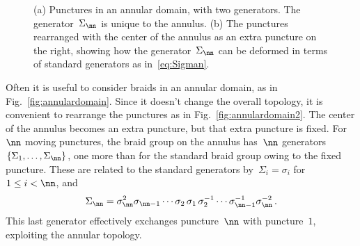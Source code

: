 \documentclass[12pt]{article}
\begin{document}
%
\begin{figure}
  \begin{center}
    \hspace{1em}
  \end{center}
  \caption{(a) Punctures in an annular domain, with two generators.  The
    generator~$\Sigma_\nn$ is unique to the annulus.  (b) The punctures
    rearranged with the center of the annulus as an extra puncture on the
    right, showing how the generator~$\Sigma_\nn$ can be deformed in terms of
    standard generators as in~\eqref{eq:Sigman}.}
\end{figure}
%

Often it is useful to consider braids in an annular domain, as in
Fig.~\ref{fig:annulardomain}.  Since it doesn't change the overall topology,
it is convenient to rearrange the punctures as in
Fig.~\ref{fig:annulardomain2}.  The center of the annulus becomes an extra
puncture, but that extra puncture is fixed.  For~$\nn$ moving punctures, the
braid group on the annulus has~$\nn$
generators~$\{\Sigma_1,\ldots,\Sigma_\nn\}$, one more than for the standard
braid group owing to the fixed puncture.  These are related to the standard
generators by~$\Sigma_i=\sigma_i$ for~$1 \le i <\nn$, and
\begin{equation}
  \Sigma_\nn = \sigma_\nn^2 \sigma_{\nn-1} \cdots \sigma_2\,\sigma_1\,
  \sigma_2^{-1} \cdots \sigma_{\nn-1}^{-1} \sigma_\nn^{-2}\,.
  \label{eq:Sigman}
\end{equation}
This last generator effectively exchanges puncture~$\nn$ with puncture~$1$,
exploiting the annular topology.
\end{document}
